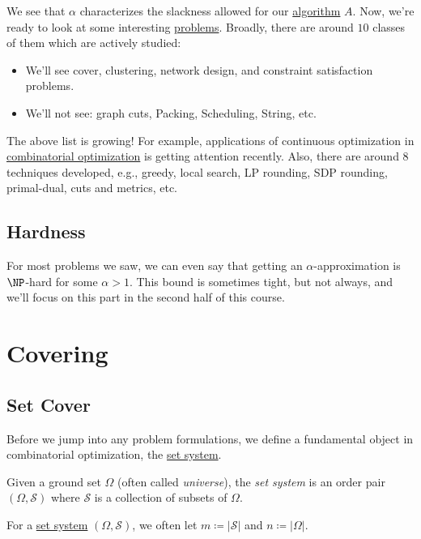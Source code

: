 We see that \(\alpha \) characterizes the slackness allowed for our \hyperref[def:algorithm]{algorithm} \(A\). Now, we're ready to look at some interesting \hyperref[def:combinatorial-optimization]{problems}. Broadly, there are around \(10\) classes of them which are actively studied:

\begin{itemize}
	\item We'll see cover, clustering, network design, and constraint satisfaction problems.
	\item We'll not see: graph cuts, Packing, Scheduling, String, etc.
\end{itemize}

The above list is growing! For example, applications of continuous optimization in \hyperref[def:combinatorial-optimization]{combinatorial optimization} is getting attention recently. Also, there are around \(8\) techniques developed, e.g., greedy, local search, LP rounding, SDP rounding, primal-dual, cuts and metrics, etc.

\section{Hardness}

For most problems we saw, we can even say that getting an \(\alpha\)-approximation is \(\NP\)-hard for some \(\alpha > 1\). This bound is sometimes tight, but not always, and we'll focus on this part in the second half of this course.

\chapter{Covering}\label{ch:covering}
\section{Set Cover}
Before we jump into any problem formulations, we define a fundamental object in combinatorial optimization, the \hyperref[def:set-system]{set system}.

\begin{definition}\label{def:set-system}
	Given a ground set \(\Omega\) (often called \emph{universe}), the \emph{set system} is an order pair \((\Omega , \mathcal{S} )\) where \(\mathcal{S} \) is a collection of subsets of \(\Omega\).
\end{definition}

\begin{note}
	For a \hyperref[def:set-system]{set system} \((\Omega , \mathcal{S} )\), we often let \(m\coloneqq \left\vert \mathcal{S}  \right\vert \) and \(n\coloneqq \left\vert \Omega  \right\vert \).
\end{note}

